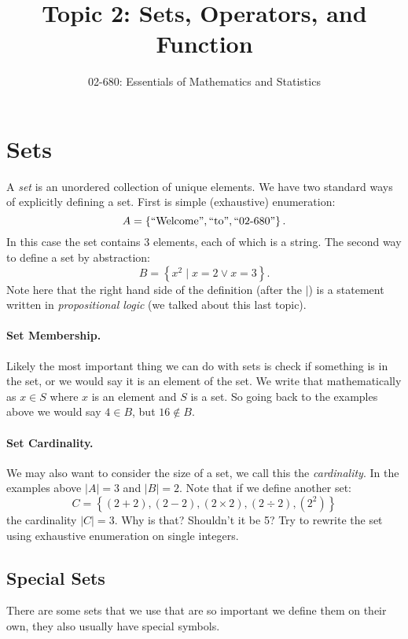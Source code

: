 


\title{Topic 2: Sets, Operators, and Function}
\author{02-680: Essentials of Mathematics and Statistics}


\maketitle

\section{Sets}
A \emph{set} is an unordered collection of unique elements. 
We have two standard ways of explicitly defining a set. 
First is simple (exhaustive) enumeration:
\[
A = \left\{\textnormal{``Welcome''}, \textnormal{``to''}, \textnormal{``02-680''}\right\}.
\]
In this case the set contains 3 elements, each of which is a string.
The second way to define a set by abstraction:
\[
B = \left\{x^2 \mid x=2 \vee x=3 \right\}.
\]
Note here that the right hand side of the definition (after the $\mid$) is a statement written in \emph{propositional logic} (we talked about this last topic).

\paragraph{Set Membership.} Likely the most important thing we can do with sets is check if something is in the set, 
or we would say it is an element of the set. 
We write that mathematically as $x \in S$ where $x$ is an element and $S$ is a set. 
So going back to the examples above we would say $4 \in B$, but $16 \notin B$.

\paragraph{Set Cardinality.} 
We may also want to consider the size of a set, we call this the \emph{cardinality}.
In the examples above $|A|=3$ and $|B| = 2$.
Note that if we define another set:
\[
C = \left\{ \left(2+2\right), \left(2-2\right), \left(2\times2\right), \left(2\div2\right), \left(2^2\right) \right\}
\]
the cardinality $|C|=3$. 
Why is that? Shouldn't it be 5? 
Try to rewrite the set using exhaustive enumeration on single integers.

\subsection{Special Sets}
There are some sets that we use that are so important we define them on their own, they also usually have special symbols. 

